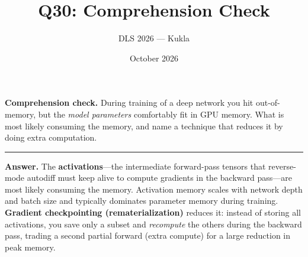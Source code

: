 \documentclass[11pt]{article}
\title{Q30: Comprehension Check}
\author{DLS 2026 --- Kukla}
\date{October 2026}
\begin{document}
\maketitle
\textbf{Comprehension check.} During training of a deep network you hit out-of-memory, but the \emph{model
parameters} comfortably fit in GPU memory. What is most likely consuming the memory, and name a technique
that reduces it by doing extra computation.

\vspace{0.8cm}\hrule\vspace{4pt}
{\small\textbf{Answer.} The \textbf{activations}---the intermediate forward-pass tensors that reverse-mode
autodiff must keep alive to compute gradients in the backward pass---are most likely consuming the memory.
Activation memory scales with network depth and batch size and typically dominates parameter memory during
training. \textbf{Gradient checkpointing (rematerialization)} reduces it: instead of storing all
activations, you save only a subset and \emph{recompute} the others during the backward pass, trading a
second partial forward (extra compute) for a large reduction in peak memory.}
\end{document}
